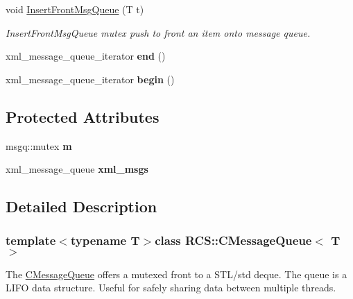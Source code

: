 \begin{DoxyCompactItemize}
void \hyperlink{class_r_c_s_1_1_c_message_queue_ab9a9aa2c8e05c74bd0b67dc2b576850f}{Insert\+Front\+Msg\+Queue} (T t)
\begin{DoxyCompactList}\small\item\em Insert\+Front\+Msg\+Queue mutex push to front an item onto message queue. \end{DoxyCompactList}\item 
\hypertarget{class_r_c_s_1_1_c_message_queue_ae8f0f317fd57acac619797badad88be2}{}xml\+\_\+message\+\_\+queue\+\_\+iterator {\bfseries end} ()\label{class_r_c_s_1_1_c_message_queue_ae8f0f317fd57acac619797badad88be2}

\item 
\hypertarget{class_r_c_s_1_1_c_message_queue_aba32094584981f8b425660cb3ee4cf50}{}xml\+\_\+message\+\_\+queue\+\_\+iterator {\bfseries begin} ()\label{class_r_c_s_1_1_c_message_queue_aba32094584981f8b425660cb3ee4cf50}

\end{DoxyCompactItemize}
\subsection*{Protected Attributes}
\begin{DoxyCompactItemize}
\item 
\hypertarget{class_r_c_s_1_1_c_message_queue_a8dbd36f86fd6f9adf1c27042d74735ff}{}msgq\+::mutex {\bfseries m}\label{class_r_c_s_1_1_c_message_queue_a8dbd36f86fd6f9adf1c27042d74735ff}

\item 
\hypertarget{class_r_c_s_1_1_c_message_queue_aa699f0b2f9f057242c5f0d3882f14ecb}{}xml\+\_\+message\+\_\+queue {\bfseries xml\+\_\+msgs}\label{class_r_c_s_1_1_c_message_queue_aa699f0b2f9f057242c5f0d3882f14ecb}

\end{DoxyCompactItemize}


\subsection{Detailed Description}
\subsubsection*{template$<$typename T$>$class R\+C\+S\+::\+C\+Message\+Queue$<$ T $>$}

The \hyperlink{class_r_c_s_1_1_c_message_queue}{C\+Message\+Queue} offers a mutexed front to a S\+T\+L/std deque. The queue is a L\+I\+F\+O data structure. Useful for safely sharing data between multiple threads. 

